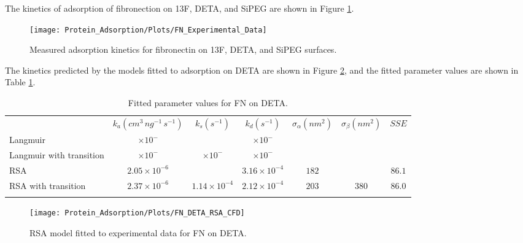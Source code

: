 The kinetics of adsorption of fibronection on 13F, DETA, and SiPEG
are shown in Figure \ref{fig:FN experiments}.%
\begin{figure}
\texttt{[image: Protein\_Adsorption/Plots/FN\_Experimental\_Data]}

\caption{\label{fig:FN experiments}Measured adsorption kinetics for fibronectin
on 13F, DETA, and SiPEG surfaces.}


%
\end{figure}
 The kinetics predicted by the models fitted to adsorption on DETA
are shown in Figure \ref{fig:FN DETA fitted}, and the fitted parameter
values are shown in Table \ref{tab:FN on DETA params}.%
\begin{table}
\caption{\label{tab:FN on DETA params}Fitted parameter values for FN on DETA.}
\begin{tabular}{>{\raggedright}p{0.75in}cccccc}
 & $k_{a}\left(cm^{3}\, ng^{-1}\, s^{-1}\right)$ & $k_{s}\left(s^{-1}\right)$ & $k_{d}\left(s^{-1}\right)$ & $\sigma_{\alpha}\left(nm^{2}\right)$ & $\sigma_{\beta}\left(nm^{2}\right)$ & $SSE$\tabularnewline[\doublerulesep]
\cline{2-7} 
\noalign{\vskip\doublerulesep}
Langmuir & $\times10^{-}$ &  & $\times10^{-}$ & $ $ &  & $ $\tabularnewline
Langmuir with transition & $\times10^{-}$ & $\times10^{-}$ & $\times10^{-}$ & $ $ & $ $ & $ $\tabularnewline
\noalign{\vskip\doublerulesep}
RSA & $2.05\times10^{-6}$ &  & $3.16\times10^{-4}$ & $182$ &  & $86.1$\tabularnewline
\noalign{\vskip\doublerulesep}
RSA with transition & $2.37\times10^{-6}$ & $1.14\times10^{-4}$ & $2.12\times10^{-4}$ & $203$ & $380$ & $86.0$\tabularnewline
\noalign{\vskip\doublerulesep}
\end{tabular}%
\end{table}
%
\begin{figure}
\texttt{[image: Protein\_Adsorption/Plots/FN\_DETA\_RSA\_CFD]}

\caption{\label{fig:FN DETA fitted}RSA model fitted to experimental data for
FN on DETA.}


%
\end{figure}


